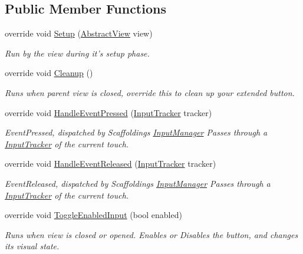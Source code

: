 \subsection*{Public Member Functions}
\begin{DoxyCompactItemize}
\item 
override void \hyperlink{class_scaffolding_1_1_scaffolding_button_a9473252a76f28a9d9605c7be23377f94}{Setup} (\hyperlink{class_scaffolding_1_1_abstract_view}{Abstract\-View} view)
\begin{DoxyCompactList}\small\item\em Run by the view during it's setup phase. \end{DoxyCompactList}\item 
override void \hyperlink{class_scaffolding_1_1_scaffolding_button_a1f295926babd2653cd63ed2933108d45}{Cleanup} ()
\begin{DoxyCompactList}\small\item\em Runs when parent view is closed, override this to clean up your extended button. \end{DoxyCompactList}\item 
override void \hyperlink{class_scaffolding_1_1_scaffolding_button_a1cc1e5b6b74c5411e1ca46dd81eb5144}{Handle\-Event\-Pressed} (\hyperlink{class_scaffolding_1_1_input_tracker}{Input\-Tracker} tracker)
\begin{DoxyCompactList}\small\item\em Event\-Pressed, dispatched by Scaffoldings \hyperlink{class_scaffolding_1_1_input_manager}{Input\-Manager} Passes through a \hyperlink{class_scaffolding_1_1_input_tracker}{Input\-Tracker} of the current touch. \end{DoxyCompactList}\item 
override void \hyperlink{class_scaffolding_1_1_scaffolding_button_ab6c3c337fc6c6c9dad69498ac5acd098}{Handle\-Event\-Released} (\hyperlink{class_scaffolding_1_1_input_tracker}{Input\-Tracker} tracker)
\begin{DoxyCompactList}\small\item\em Event\-Released, dispatched by Scaffoldings \hyperlink{class_scaffolding_1_1_input_manager}{Input\-Manager} Passes through a \hyperlink{class_scaffolding_1_1_input_tracker}{Input\-Tracker} of the current touch. \end{DoxyCompactList}\item 
override void \hyperlink{class_scaffolding_1_1_scaffolding_button_aa84a30d26afd5a3f54b5614d6e09e535}{Toggle\-Enabled\-Input} (bool enabled)
\begin{DoxyCompactList}\small\item\em Runs when view is closed or opened. Enables or Disables the button, and changes its visual state. \end{DoxyCompactList}\item 

\end{DoxyCompactItemize}

